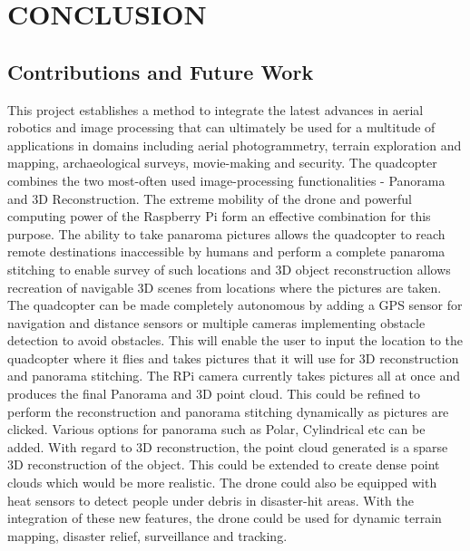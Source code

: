 
\chapter{CONCLUSION} %
\section{Contributions and Future Work}
This project establishes a method to integrate the latest advances in aerial robotics and image processing that can ultimately be used for a multitude of applications in domains including aerial photogrammetry, terrain exploration and mapping, archaeological surveys, movie-making and security. The quadcopter combines the two most-often used image-processing functionalities - Panorama and 3D Reconstruction. The extreme mobility of the drone and powerful computing power of the Raspberry Pi form an effective combination for this purpose.
\newline \newline
The ability to take panaroma pictures allows the quadcopter to reach remote destinations inaccessible by humans and perform a complete panaroma stitching to enable survey of such locations and 3D object reconstruction allows recreation of navigable 3D scenes from locations where the pictures are taken.
\newline \newline
\noindent
The quadcopter can be made completely autonomous by adding a GPS sensor for navigation and distance sensors or multiple cameras implementing obstacle detection to avoid obstacles. This will enable the user to input the location to the quadcopter where it flies and takes pictures that it will use for 3D reconstruction and panorama stitching.
\newline \newline
The RPi camera currently takes pictures all at once and produces the final Panorama and 3D point cloud. This could be refined to perform the reconstruction and panorama stitching dynamically as pictures are clicked. Various options for panorama such as Polar, Cylindrical etc can be added. With regard to 3D reconstruction, the point cloud generated is a sparse 3D reconstruction of the object. This could be extended to create dense point clouds which would be more realistic. 
\newline \newline
The drone could also be equipped with heat sensors to detect people under debris in disaster-hit areas. With the integration of these new features, the drone could be used for dynamic terrain mapping, disaster relief, surveillance and tracking.